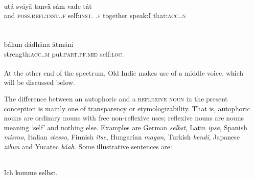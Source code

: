 \ea\label{ex:12}
\\
\gll utá  sváy\=a  tanv\`{\=a}  sám  vade  tát\\
 and  \textsc{poss}.\textsc{refl}:\textsc{inst}.\glsg.\textsc{f}  self:\textsc{inst}. \glsg.\textsc{f}  together  speak:I  that:\textsc{acc}.\glsg.\textsc{n}\\
\\
\z
\noindent \ea\label{ex:13}
 \\
\gll bálam  dádh\=ana  \=atmáni\\
strength:\textsc{acc}.\glsg.\textsc{m}  put:\textsc{part}.\textsc{pf}.\textsc{mid}  self:\textsc{loc}.\glsg\\
\\
\z
\noindent At the other end of the spectrum, Old Indic makes use of a middle voice, which will be discussed below.

The difference between an autophoric and a \textsc{reflexive noun} in the present conception is mainly one of transparency or etymologizability. That is, autophoric nouns are ordinary nouns with free non-reflexive uses; reflexive nouns are nouns meaning ‘self’ and nothing else. Examples are German \textit{selbst}, Latin \textit{ipse}, Spanish \textit{mismo}, Italian \textit{stesso}, Finnish \textit{itse}, Hungarian \textit{magan}, Turkish \textit{kendi}, Japanese \textit{zibun} and Yucatec \textit{báah}. Some illustrative sentences are:

\ea\label{ex:E14}
\langinfo{\LangGerm}{}{}\\
 \ea
 Ich komme selbst.\\
  

